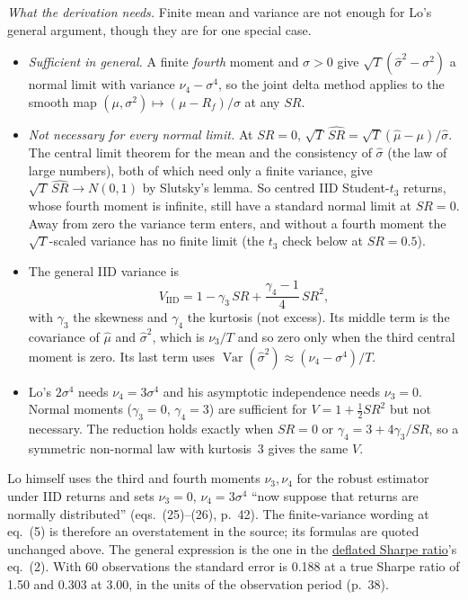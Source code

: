 \begin{qfmethod}
\emph{What the derivation needs.} Finite mean and variance are not enough for Lo's general argument, though they are for one special case.
\begin{itemize}
\item \emph{Sufficient in general.} A finite \emph{fourth} moment and $\sigma>0$ give $\sqrt T(\hat\sigma^2-\sigma^2)$ a normal limit with variance $\nu_4-\sigma^4$, so the joint delta method applies to the smooth map $(\mu,\sigma^2)\mapsto(\mu-R_f)/\sigma$ at any $SR$.
\item \emph{Not necessary for every normal limit.} At $SR=0$, $\sqrt T\,\widehat{SR}=\sqrt T(\hat\mu-\mu)/\hat\sigma$. The central limit theorem for the mean and the consistency of $\hat\sigma$ (the law of large numbers), both of which need only a finite variance, give $\sqrt T\,\widehat{SR}\to N(0,1)$ by Slutsky's lemma. So centred IID Student-$t_3$ returns, whose fourth moment is infinite, still have a standard normal limit at $SR=0$. Away from zero the variance term enters, and without a fourth moment the $\sqrt T$-scaled variance has no finite limit (the $t_3$ check below at $SR=0.5$).
\item The general IID variance is
\[ V_{\mathrm{IID}}=1-\gamma_3\,SR+\frac{\gamma_4-1}{4}\,SR^2, \]
with $\gamma_3$ the skewness and $\gamma_4$ the kurtosis (not excess). Its middle term is the covariance of $\hat\mu$ and $\hat\sigma^2$, which is $\nu_3/T$ and so zero only when the third central moment is zero. Its last term uses $\operatorname{Var}(\hat\sigma^2)\approx(\nu_4-\sigma^4)/T$.
\item Lo's $2\sigma^4$ needs $\nu_4=3\sigma^4$ and his asymptotic independence needs $\nu_3=0$. Normal moments ($\gamma_3=0$, $\gamma_4=3$) are sufficient for $V=1+\tfrac12SR^2$ but not necessary. The reduction holds exactly when $SR=0$ or $\gamma_4=3+4\gamma_3/SR$, so a symmetric non-normal law with kurtosis~3 gives the same $V$.
\end{itemize}
Lo himself uses the third and fourth moments $\nu_3,\nu_4$ for the robust estimator under IID returns and sets $\nu_3=0$, $\nu_4=3\sigma^4$ ``now suppose that returns are normally distributed'' (eqs.~(25)--(26), p.~42). The finite-variance wording at eq.~(5) is therefore an overstatement in the source; its formulas are quoted unchanged above. The general expression is the one in the \hyperref[meth:deflated-sharpe-ratio]{deflated Sharpe ratio}'s eq.~(2). With 60 observations the standard error is 0.188 at a true Sharpe ratio of 1.50 and 0.303 at 3.00, in the units of the observation period (p.~38).


\end{qfmethod}
